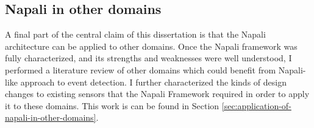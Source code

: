 \subsection{Napali in other domains}\label{subsec:napali-in-other-domains}
A final part of the central claim of this dissertation is that the Napali architecture can be applied to other domains.
Once the Napali framework was fully characterized, and its strengths and weaknesses were well understood, I performed a literature review of other domains which could benefit from Napali-like approach to event detection.
I further characterized the kinds of design changes to existing sensors that the Napali Framework required in order to apply it to these domains.
This work is can be found in Section \ref{sec:application-of-napali-in-other-domains}.
